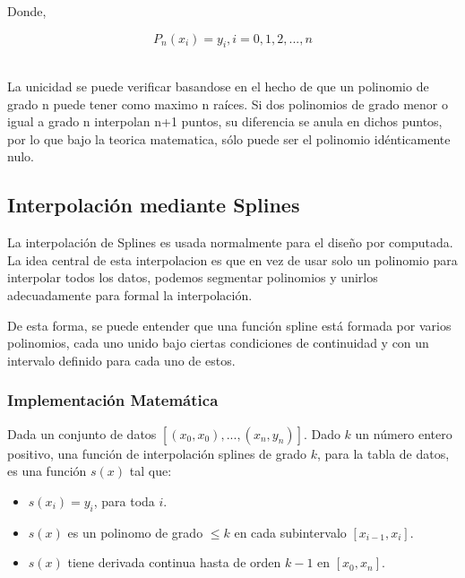 \documentclass[conference]{IEEEtran}
\begin{document}
Donde, \par

\[ P_n(x_i) = y_i, i = 0,1,2,...,n \]\

La unicidad se puede verificar basandose en el hecho de que un polinomio de grado n puede tener como maximo n raíces. Si dos polinomios de grado menor o igual a grado n interpolan n+1 puntos, su diferencia se anula en dichos puntos, por lo que bajo la teorica matematica, sólo puede ser el polinomio idénticamente nulo. \cite{b1}\par

\subsection{Interpolación mediante Splines}

La interpolación de Splines es usada normalmente para el diseño por computada. La idea central de esta interpolacion es que en vez de usar solo un polinomio para interpolar todos los datos, podemos segmentar polinomios y unirlos adecuadamente para formal la interpolación. \par

De esta forma, se puede entender que una función spline está formada por varios polinomios, cada uno unido bajo ciertas condiciones de continuidad y con un intervalo definido para cada uno de estos.\par

\subsubsection{Implementación Matemática}

Dada un conjunto de datos $[(x_0,x_0),...,(x_n,y_n)]$. Dado $k$ un número entero positivo, una función de interpolación splines de grado $k$, para la tabla de datos, es una función $s(x)$ tal que:\cite{b2}\par

\begin{itemize}
    \item $s(x_i) = y_i$, para toda $i$.
    \item $s(x)$ es un polinomo de grado $\leq k$ en cada subintervalo $[x_{i-1},x_i]$.
    \item $s(x)$ tiene derivada continua hasta de orden $k-1$ en $[x_0,x_n]$.
\end{itemize}

%
\end{document}
